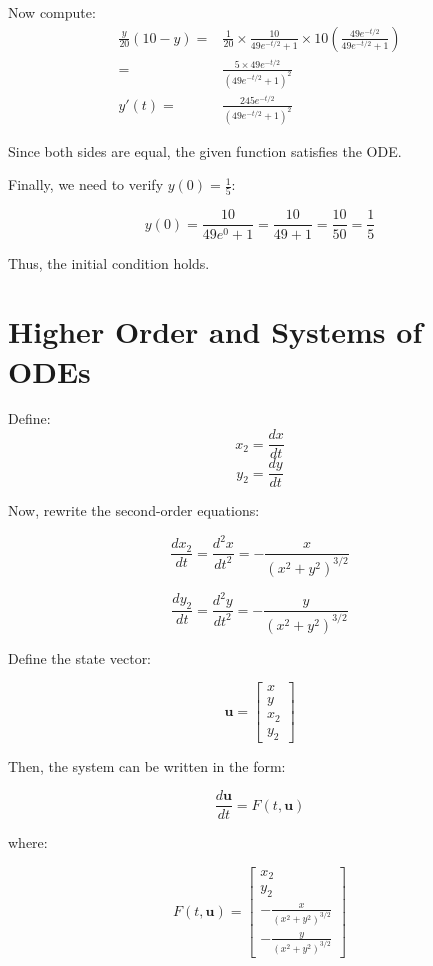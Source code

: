 \documentclass{article}
\begin{document}
Now compute:
\begin{align*}
    \frac{y}{20} (10 - y) = & \frac{1}{20} \times \frac{10}{49e^{-t/2} + 1} \times 10 \left(\frac{49e^{-t/2}}{49e^{-t/2} + 1} \right) \\
    =                       & \frac{5 \times 49e^{-t/2}}{(49e^{-t/2} + 1)^2}                                                          \\
    y'(t)=                  & \frac{245 e^{-t/2}}{(49e^{-t/2} + 1)^2}
\end{align*}

Since both sides are equal, the given function satisfies the ODE.

Finally, we need to verify $ y(0) = \frac{1}{5} $:

$$
    y(0) = \frac{10}{49e^{0} + 1} = \frac{10}{49 + 1} = \frac{10}{50} = \frac{1}{5}
$$

Thus, the initial condition holds.

\newpage
\section{Higher Order and Systems of ODEs}
Define:
$$ x_2 = \frac{dx}{dt} $$
$$ y_2 = \frac{dy}{dt} $$

Now, rewrite the second-order equations:

$$
    \frac{d x_2}{dt} = \dfrac{d^2x}{dt^2} = - \frac{x}{(x^2 + y^2)^{3/2}}
$$

$$
    \frac{d y_2}{dt} = \dfrac{d^2y}{dt^2} = - \frac{y}{(x^2 + y^2)^{3/2}}
$$

Define the state vector:

$$
    \mathbf{u} = \begin{bmatrix} x \\ y \\ x_2 \\ y_2 \end{bmatrix}
$$

Then, the system can be written in the form:

$$
    \frac{d \mathbf{u}}{dt} = F(t, \mathbf{u})
$$

where:

$$
    F(t, \mathbf{u}) =
    \begin{bmatrix}
        x_2                           \\
        y_2                           \\
        - \frac{x}{(x^2 + y^2)^{3/2}} \\
        - \frac{y}{(x^2 + y^2)^{3/2}}
    \end{bmatrix}
$$
\end{document}
